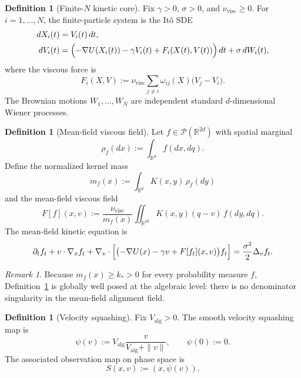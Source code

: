 \documentclass[11pt]{article}
\theoremstyle{definition}
\newtheorem{definition}[theorem]{Definition}
\theoremstyle{remark}
\newtheorem{remark}[theorem]{Remark}
\newcommand{\R}{\mathbb{R}}
\newcommand{\mcP}{\mathcal{P}}
\begin{document}
\begin{definition}[Finite-$N$ kinetic core]\label{def:finiteN}
Fix $\gamma>0$, $\sigma>0$, and $\nu_{\mathrm{visc}}\geq0$. For $i=1,\dots,N$,
the finite-particle system is the It\^o SDE
\begin{align}
dX_i(t) &= V_i(t)\,dt,\label{eq:finite-x}\\
dV_i(t) &=
\Bigl(-\nabla U(X_i(t))-\gamma V_i(t)+F_i(X(t),V(t))\Bigr)\,dt
+\sigma\,dW_i(t),\label{eq:finite-v}
\end{align}
where the viscous force is
\begin{equation}\label{eq:finite-visc}
F_i(X,V)
:=
\nu_{\mathrm{visc}}\sum_{j\neq i}\omega_{ij}(X)\bigl(V_j-V_i\bigr).
\end{equation}
The Brownian motions $W_1,\dots,W_N$ are independent standard
$d$-dimensional Wiener processes.
\end{definition}

\begin{definition}[Mean-field viscous field]\label{def:mean-field}
Let $f\in\mcP(\R^{2d})$ with spatial marginal
\[
\rho_f(dx):=\int_{\R^d}f(dx,dq).
\]
Define the normalized kernel mass
\[
m_f(x):=\int_{\R^d}K(x,y)\,\rho_f(dy)
\]
and the mean-field viscous field
\begin{equation}\label{eq:mf-force}
F[f](x,v)
:=
\frac{\nu_{\mathrm{visc}}}{m_f(x)}
\iint_{\R^{2d}}K(x,y)(q-v)\,f(dy,dq).
\end{equation}
The mean-field kinetic equation is
\begin{equation}\label{eq:mf-pde}
\partial_t f_t
+v\cdot\nabla_x f_t
+\nabla_v\cdot\Bigl[\bigl(-\nabla U(x)-\gamma v+F[f_t](x,v)\bigr)f_t\Bigr]
=\frac{\sigma^2}{2}\Delta_v f_t.
\end{equation}
\end{definition}

\begin{remark}
Because $m_f(x)\geq k_*>0$ for every probability measure $f$,
Definition~\ref{def:mean-field} is globally well posed at the algebraic level:
there is no denominator singularity in the mean-field alignment field.
\end{remark}

\begin{definition}[Velocity squashing]\label{def:squash}
Fix $V_{\mathrm{alg}}>0$. The smooth velocity squashing map is
\[
\psi(v):=
V_{\mathrm{alg}}\frac{v}{V_{\mathrm{alg}}+\|v\|},
\qquad
\psi(0):=0.
\]
The associated observation map on phase space is
\[
S(x,v):=(x,\psi(v)).
\]
\end{definition}
\end{document}
